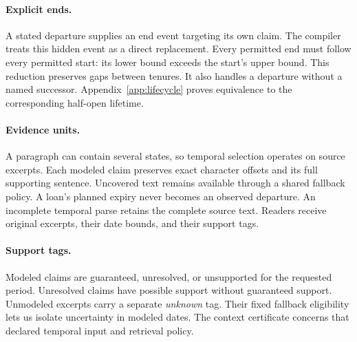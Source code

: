 \paragraph{Explicit ends.}
A stated departure supplies an end event targeting its own claim.
The compiler treats this hidden event as a direct replacement.
Every permitted end must follow every permitted start: its lower bound exceeds the start's upper bound.
This reduction preserves gaps between tenures.
It also handles a departure without a named successor.
Appendix~\ref{app:lifecycle} proves equivalence to the corresponding half-open lifetime.

\paragraph{Evidence units.}
A paragraph can contain several states, so temporal selection operates on source excerpts.
Each modeled claim preserves exact character offsets and its full supporting sentence.
Uncovered text remains available through a shared fallback policy.
A loan's planned expiry never becomes an observed departure.
An incomplete temporal parse retains the complete source text.
Readers receive original excerpts, their date bounds, and their support tags.

\paragraph{Support tags.}
Modeled claims are guaranteed, unresolved, or unsupported for the requested period.
Unresolved claims have possible support without guaranteed support.
Unmodeled excerpts carry a separate \emph{unknown} tag.
Their fixed fallback eligibility lets us isolate uncertainty in modeled dates.
The context certificate concerns that declared temporal input and retrieval policy.
